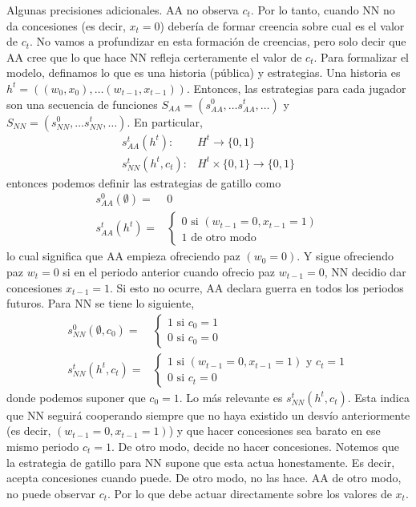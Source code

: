 \documentclass[11pt]{article}
\begin{document}
Algunas precisiones adicionales. AA no observa $c_{t}$. Por lo tanto, cuando NN no da concesiones (es decir, $x_{t}=0$) deber\'ia de formar creencia sobre cual es el valor de $c_{t}$. No vamos a profundizar en esta formaci\'on de creencias, pero solo decir que AA cree que lo que hace NN refleja certeramente el valor de $c_{t}$. Para formalizar el modelo, definamos lo que es una historia (p\'ublica) y estrategias. Una historia es $h^{t} = \left( (w_{0},x_{0}), \dots (w_{t-1},x_{t-1}) \right)$. Entonces, las estrategias para cada jugador son una secuencia de funciones $S_{AA} = \left( s_{AA}^{0}, \dots s_{AA}^{t}, \dots \right)$ y $S_{NN} = \left( s_{NN}^{0}, \dots s_{NN}^{t}, \dots \right)$. En particular,
\begin{align*}
	s_{AA}^{t}(h^{t}): & H^{t} \rightarrow \{0,1\} \\
	s_{NN}^{t}(h^{t}, c_{t}): & H^{t} \times \{0,1\} \rightarrow \{0,1\} 
\end{align*} entonces podemos definir las estrategias de gatillo como
\begin{align*}
	s_{AA}^{0}(\emptyset) = & 0 \\
	s_{AA}^{t}(h^{t}) = & \begin{cases}
		0 \text{ si } (w_{t-1} = 0, x_{t-1} = 1) \\
		1 \text{ de otro modo } 
	\end{cases} 
\end{align*} lo cual significa que AA empieza ofreciendo paz $(w_{0} = 0)$. Y sigue ofreciendo paz $w_{t} = 0$ si en el periodo anterior cuando ofrecio paz $w_{t-1} = 0$, NN decidio dar concesiones $x_{t-1} = 1$. Si esto no ocurre, AA declara guerra en todos los periodos futuros. Para NN se tiene lo siguiente,
\begin{align*}
	s_{NN}^{0}(\emptyset,c_{0}) = & \begin{cases}
		1 \text{ si } c_{0} = 1 \\
		0 \text{ si } c_{0} = 0
	\end{cases} \\
	s_{NN}^{t}(h^{t},c_{t}) = & \begin{cases}
		1 \text{ si } (w_{t-1} = 0, x_{t-1} = 1) \text{ y } c_{t} = 1 \\
		0 \text{ si } c_{t} = 0
	\end{cases} 
\end{align*} donde podemos suponer que $c_{0} = 1$. Lo m\'as relevante es $s_{NN}^{t}(h^{t},c_{t})$. Esta indica que NN seguir\'a cooperando siempre que no haya existido un desv\'io anteriormente (es decir, $(w_{t-1} = 0, x_{t-1} = 1)$) y que hacer concesiones sea barato en ese mismo periodo $c_{t}=1$. De otro modo, decide no hacer concesiones. Notemos que la estrategia de gatillo para NN supone que esta actua honestamente. Es decir, acepta concesiones cuando puede. De otro modo, no las hace. AA de otro modo, no puede observar $c_{t}$. Por lo que debe actuar directamente sobre los valores de $x_{t}$.
\end{document}
